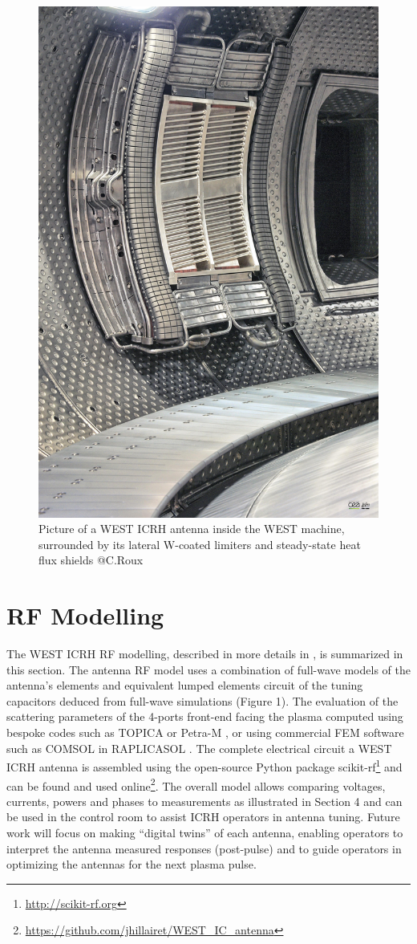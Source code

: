 \documentclass[12p]{iopart}
\begin{document}
\begin{figure}
	\centering
	\includegraphics[width=0.7\linewidth]{figures/6}
	\caption{Picture of a WEST ICRH antenna inside the WEST machine, surrounded by its lateral W-coated limiters and steady-state heat flux shields @C.Roux}
	\label{fig:ICRH_antenna_inside_WEST}
\end{figure}


\section{RF Modelling}
The WEST ICRH RF modelling, described in more details in \cite{helou2015-2, hillairet2020-2}, is summarized in this section. The antenna RF model uses a combination of full-wave models of the antenna’s elements and equivalent lumped elements circuit of the tuning capacitors deduced from full-wave simulations (Figure 1). The evaluation of the scattering parameters of the 4-ports front-end facing the plasma computed using bespoke codes such as TOPICA \cite{milanesio2009} or Petra-M \cite{bertelli2020, shiraiwa2021}, or using commercial FEM software such as COMSOL in RAPLICASOL \cite{tierens2020-2}. The complete electrical circuit a WEST ICRH antenna is assembled using the open-source Python package scikit-rf\footnote{\url{http://scikit-rf.org}}  and can be found and used online\footnote{\url{https://github.com/jhillairet/WEST_IC_antenna}}. The overall model allows comparing voltages, currents, powers and phases to measurements as illustrated in Section 4 and can be used in the control room to assist ICRH operators in antenna tuning. Future work will focus on making “digital twins” of each antenna, enabling operators to interpret the antenna measured responses (post-pulse) and to guide operators in optimizing the antennas for the next plasma pulse.
\end{document}
